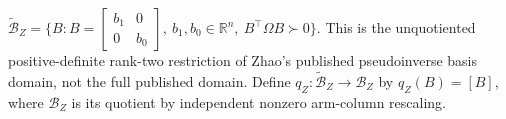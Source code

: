 \(\widetilde{\mathcal B}_Z=\{B:B=\begin{bmatrix}b_1&0\\0&b_0\end{bmatrix},\ b_1,b_0\in\mathbb R^n,\ B^{\top}\Omega B\succ0\}\).  This is the unquotiented positive-definite rank-two restriction of Zhao's published pseudoinverse basis domain, not the full published domain.  Define \(q_Z:\widetilde{\mathcal B}_Z\to\mathcal B_Z\) by \(q_Z(B)=[B]\), where \(\mathcal B_Z\) is its quotient by independent nonzero arm-column rescaling.
